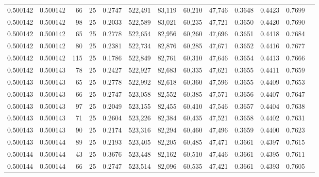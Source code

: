 \begin{tabular}{rrrrrrrrrrrrr}
0.500142 & 0.500142 &    66 &  25 &                                     0.2747 & 522,491 &  83,119 &  60,210 &  47,746 & 0.3648 & 0.4423 & 0.7699 \\
0.500142 & 0.500142 &    98 &  25 &                                     0.2033 & 522,589 &  83,021 &  60,235 &  47,721 & 0.3650 & 0.4420 & 0.7690 \\
0.500142 & 0.500142 &    65 &  25 &                                     0.2778 & 522,654 &  82,956 &  60,260 &  47,696 & 0.3651 & 0.4418 & 0.7684 \\
0.500142 & 0.500142 &    80 &  25 &                                     0.2381 & 522,734 &  82,876 &  60,285 &  47,671 & 0.3652 & 0.4416 & 0.7677 \\
0.500142 & 0.500142 &   115 &  25 &                                     0.1786 & 522,849 &  82,761 &  60,310 &  47,646 & 0.3654 & 0.4413 & 0.7666 \\
0.500142 & 0.500143 &    78 &  25 &                                     0.2427 & 522,927 &  82,683 &  60,335 &  47,621 & 0.3655 & 0.4411 & 0.7659 \\
0.500143 & 0.500143 &    65 &  25 &                                     0.2778 & 522,992 &  82,618 &  60,360 &  47,596 & 0.3655 & 0.4409 & 0.7653 \\
0.500143 & 0.500143 &    66 &  25 &                                     0.2747 & 523,058 &  82,552 &  60,385 &  47,571 & 0.3656 & 0.4407 & 0.7647 \\
0.500143 & 0.500143 &    97 &  25 &                                     0.2049 & 523,155 &  82,455 &  60,410 &  47,546 & 0.3657 & 0.4404 & 0.7638 \\
0.500143 & 0.500143 &    71 &  25 &                                     0.2604 & 523,226 &  82,384 &  60,435 &  47,521 & 0.3658 & 0.4402 & 0.7631 \\
0.500143 & 0.500143 &    90 &  25 &                                     0.2174 & 523,316 &  82,294 &  60,460 &  47,496 & 0.3659 & 0.4400 & 0.7623 \\
0.500143 & 0.500144 &    89 &  25 &                                     0.2193 & 523,405 &  82,205 &  60,485 &  47,471 & 0.3661 & 0.4397 & 0.7615 \\
0.500144 & 0.500144 &    43 &  25 &                                     0.3676 & 523,448 &  82,162 &  60,510 &  47,446 & 0.3661 & 0.4395 & 0.7611 \\
0.500144 & 0.500144 &    66 &  25 &                                     0.2747 & 523,514 &  82,096 &  60,535 &  47,421 & 0.3661 & 0.4393 & 0.7605 \\

\end{tabular}

